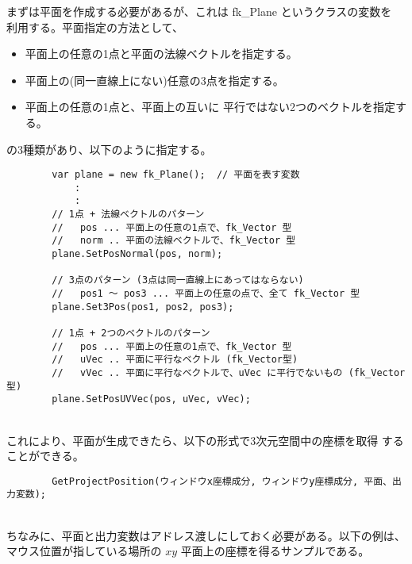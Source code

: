 まずは平面を作成する必要があるが、これは fk\_Plane というクラスの変数を
利用する。平面指定の方法として、
\begin{itemize}
 \item 平面上の任意の1点と平面の法線ベクトルを指定する。
 \item 平面上の(同一直線上にない)任意の3点を指定する。
 \item 平面上の任意の1点と、平面上の互いに
	平行ではない2つのベクトルを指定する。
\end{itemize}
の3種類があり、以下のように指定する。
\\
\begin{breakbox}
\begin{verbatim}
        var plane = new fk_Plane();  // 平面を表す変数
            :
            :
        // 1点 + 法線ベクトルのパターン
        //   pos ... 平面上の任意の1点で、fk_Vector 型
        //   norm .. 平面の法線ベクトルで、fk_Vector 型
        plane.SetPosNormal(pos, norm);

        // 3点のパターン (3点は同一直線上にあってはならない)
        //   pos1 〜 pos3 ... 平面上の任意の点で、全て fk_Vector 型
        plane.Set3Pos(pos1, pos2, pos3);

        // 1点 + 2つのベクトルのパターン
        //   pos ... 平面上の任意の1点で、fk_Vector 型
        //   uVec .. 平面に平行なベクトル (fk_Vector型)
        //   vVec .. 平面に平行なベクトルで、uVec に平行でないもの (fk_Vector 型)
        plane.SetPosUVVec(pos, uVec, vVec);
\end{verbatim}
\end{breakbox}
~ \\
これにより、平面が生成できたら、以下の形式で3次元空間中の座標を取得
することができる。
\\
\begin{screen}
\begin{verbatim}
        GetProjectPosition(ウィンドウx座標成分, ウィンドウy座標成分, 平面、出力変数);
\end{verbatim}
\end{screen}
~ \\
ちなみに、平面と出力変数はアドレス渡しにしておく必要がある。以下の例は、
マウス位置が指している場所の \(xy\) 平面上の座標を得るサンプルである。
\\
